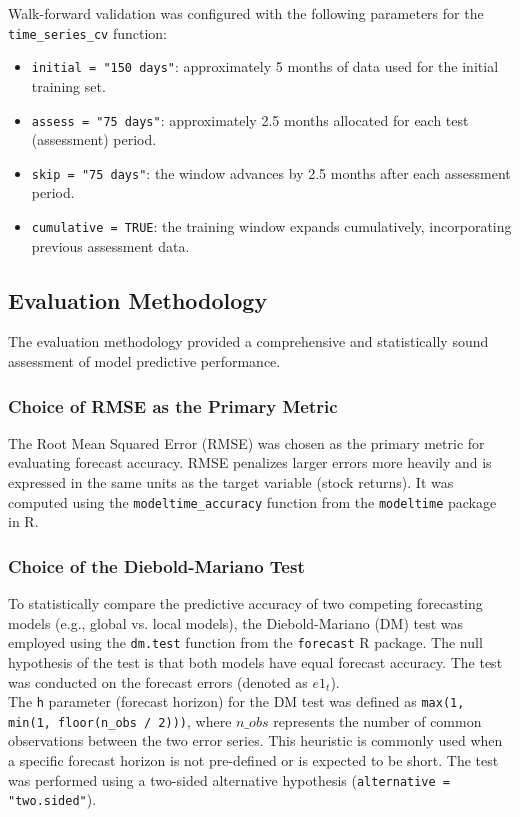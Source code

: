 \documentclass[12pt]{report}
\begin{document}
Walk-forward validation was configured with the following parameters for the \texttt{time\_series\_cv} function:
\begin{itemize}
    \item \texttt{initial = "150 days"}: approximately 5 months of data used for the initial training set.
    \item \texttt{assess = "75 days"}: approximately 2.5 months allocated for each test (assessment) period.
    \item \texttt{skip = "75 days"}: the window advances by 2.5 months after each assessment period.
    \item \texttt{cumulative = TRUE}: the training window expands cumulatively, incorporating previous assessment data.
\end{itemize}


\subsection{Evaluation Methodology}
The evaluation methodology provided a comprehensive and statistically sound assessment of model predictive performance.

\subsubsection{Choice of RMSE as the Primary Metric}

The Root Mean Squared Error (RMSE) was chosen as the primary metric for evaluating forecast accuracy. RMSE penalizes larger errors more heavily and is expressed in the same units as the target variable (stock returns). It was computed using the \texttt{modeltime\_accuracy} function from the \texttt{modeltime} package in R.

\subsubsection{Choice of the Diebold-Mariano Test}

To statistically compare the predictive accuracy of two competing forecasting models (e.g., global vs. local models), the Diebold-Mariano (DM) test was employed using the \texttt{dm.test} function from the \texttt{forecast} R package. The null hypothesis of the test is that both models have equal forecast accuracy. The test was conducted on the forecast errors (denoted as \( e1_t \)).\\

The \texttt{h} parameter (forecast horizon) for the DM test was defined as \texttt{max(1, min(1, floor(n\_obs / 2)))}, where \( n\_obs \) represents the number of common observations between the two error series. This heuristic is commonly used when a specific forecast horizon is not pre-defined or is expected to be short. The test was performed using a two-sided alternative hypothesis (\texttt{alternative = "two.sided"}).
\end{document}
